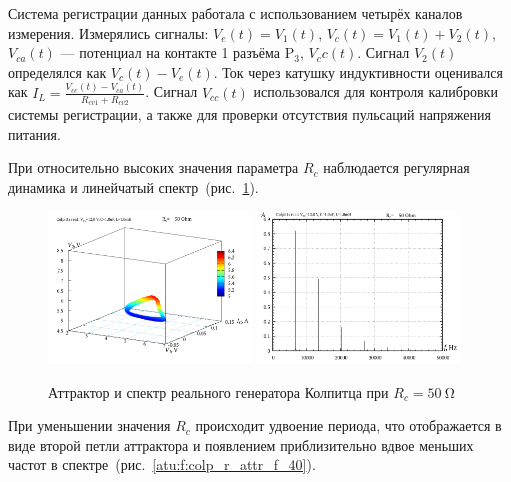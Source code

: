 Система регистрации данных работала с использованием четырёх
каналов измерения. Измерялись сигналы:
$V_e(t) = V_1(t)$,
$V_c(t) = V_1(t) + V_2(t)$,
$V_{ca}(t)$ --- потенциал на контакте 1 разъёма $\mathrm{P}_3$,
$V_cc(t)$.
Сигнал $V_2(t)$ определялся как $V_c(t) - V_e(t)$.
Ток через катушку индуктивности оценивался как
$I_L = \frac{V_{cc}(t) - V_{ca}(t)}{R_{cv1}+R_{cv2}}$.
Сигнал $V_{cc}(t)$ использовался для контроля калибровки
системы регистрации, а также для проверки отсутствия пульсаций напряжения питания.



При относительно высоких значения параметра $R_c$
наблюдается регулярная динамика и линейчатый спектр~(рис.~\ref{atu:f:colp_r_attr_f_50}).

\begin{figure}[htb!]
  \centerline{
    \includegraphics[width=0.48\textwidth]{p/r/v1iv2_050000.png}
    \hfill
    \includegraphics[width=0.48\textwidth]{p/r/f_050000.png}
  }
  \caption{Аттрактор и спектр реального генератора Колпитца при $R_c = \SI{50}{\ohm} $}
  \label{atu:f:colp_r_attr_f_50}
\end{figure}

При уменьшении значения $R_c$
происходит удвоение периода,
что отображается в виде второй петли аттрактора
и появлением приблизительно вдвое меньших частот в спектре~(рис.~\ref{atu:f:colp_r_attr_f_40}).

